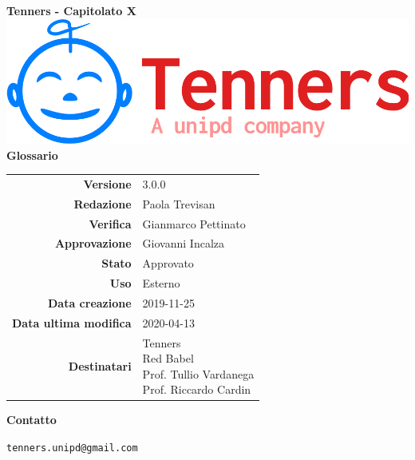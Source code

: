 \begin{titlepage}
	\begin{center}
		\large \textbf{Tenners - Capitolato X}
		\vfill
		\includegraphics[scale = 0.3]{./res/img/logo.png}\\
		\vfill
		\Huge \textbf{Glossario}

        \vfill
        \large

        \begin{tabular}{r|l}
                        \textbf{Versione} & 3.0.0 \\
                        \textbf{Redazione} &
                        Paola Trevisan\\
                        \textbf{Verifica} &
                        Gianmarco Pettinato \\
                        \textbf{Approvazione} & Giovanni Incalza \\
                        \textbf{Stato} & Approvato \\
                        \textbf{Uso} &  Esterno\\
                        \textbf{Data creazione} &  2019-11-25\\
                        \textbf{Data ultima modifica} & 2020-04-13 \\
                        \textbf{Destinatari} & \parbox[t]{5cm}{Tenners \\ Red Babel \\ Prof. Tullio Vardanega\\Prof. Riccardo Cardin}
                \end{tabular}
                \vfill
                \normalsize
                \vfill
                \textbf{Contatto}

                \texttt{tenners.unipd@gmail.com}

	\end{center}
\end{titlepage}
